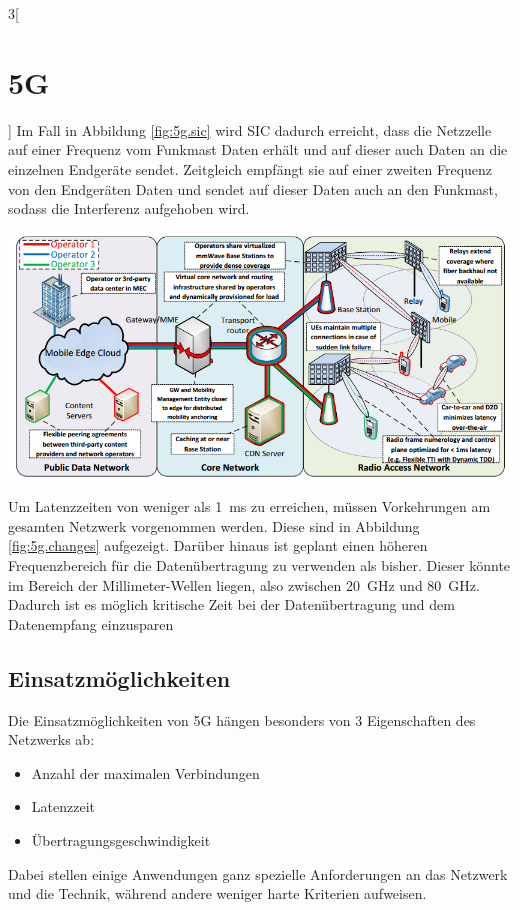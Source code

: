 \begin{multicols}{3}[\section{5G}]
Im Fall in Abbildung \ref{fig:5g.sic} wird SIC dadurch erreicht, dass die Netzzelle auf einer Frequenz vom Funkmast Daten erhält und auf dieser auch Daten an die einzelnen Endgeräte sendet. Zeitgleich empfängt sie auf einer zweiten Frequenz von den Endgeräten Daten und sendet auf dieser Daten auch an den Funkmast, sodass die Interferenz aufgehoben wird.

\begin{Figure}
\includegraphics[width=\linewidth]{Kapitel/5G/Grafiken/5g-changes}
\label{fig:5g.changes}
\end{Figure}


Um Latenzzeiten von weniger als \SI{1}{\milli\second} zu erreichen, müssen Vorkehrungen am gesamten  Netzwerk vorgenommen werden. Diese sind in Abbildung \ref{fig:5g.changes} aufgezeigt.
Darüber hinaus ist geplant einen höheren Frequenzbereich für die Datenübertragung zu verwenden als bisher. Dieser könnte im Bereich der Millimeter-Wellen liegen, also zwischen \SI{20}{\giga\hertz} und \SI{80}{\giga\hertz}.
Dadurch ist es möglich kritische Zeit bei der Datenübertragung und dem Datenempfang einzusparen
\subsection*{Einsatzmöglichkeiten}
Die Einsatzmöglichkeiten von 5G hängen besonders von 3 Eigenschaften des Netzwerks ab:
\begin{itemize}
\item Anzahl der maximalen Verbindungen
\item Latenzzeit
\item Übertragungsgeschwindigkeit
\end{itemize}

Dabei stellen einige Anwendungen ganz spezielle Anforderungen an das Netzwerk und die Technik, während andere weniger harte Kriterien aufweisen.


\end{multicols}
